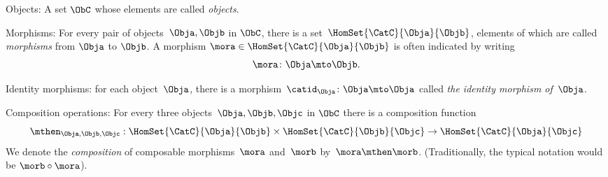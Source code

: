 {\begin{forslides}
\begin{ctdefinition}
\begin{body}
\begin{compactenum}
                    \item Objects: A set $\ObC$ whose elements are called \emph{objects}.
                    \item Morphisms: For every pair of objects~$\Obja,\Objb$ in $\ObC$, there is a set~$\HomSet{\CatC}{\Obja}{\Objb}$, elements of which are called \emph{morphisms} from $\Obja$ to $\Objb$.
A morphism $\mora \in \HomSet{\CatC}{\Obja}{\Objb}$ is often indicated by writing
                    \begin{equation*}
                        \mora \colon \Obja \mto \Objb.
                    \end{equation*}
                    \item Identity morphisms: for each object~$\Obja$, there is a morphism~$\catid_{\Obja}\colon \Obja \mto \Obja$  called \emph{the identity morphism of~$\Obja$}.
                    \item Composition operations: For every three objects~$\Obja,\Objb,\Objc$ in $\ObC$ there is a composition function
                    \begin{equation*}
                        \mthen_{\Obja,\Objb,\Objc}: \HomSet{\CatC}{\Obja}{\Objb} \times \HomSet{\CatC}{\Objb}{\Objc}\to \HomSet{\CatC}{\Obja}{\Objc}
                    \end{equation*}
                    We denote the \emph{composition} of composable morphisms~$\mora$ and~$\morb$ by~$\mora \mthen \morb$. (Traditionally, the typical notation would be $\morb \circ \mora$).
                

\end{compactenum}
\end{body}
\end{ctdefinition}
\end{forslides}}
